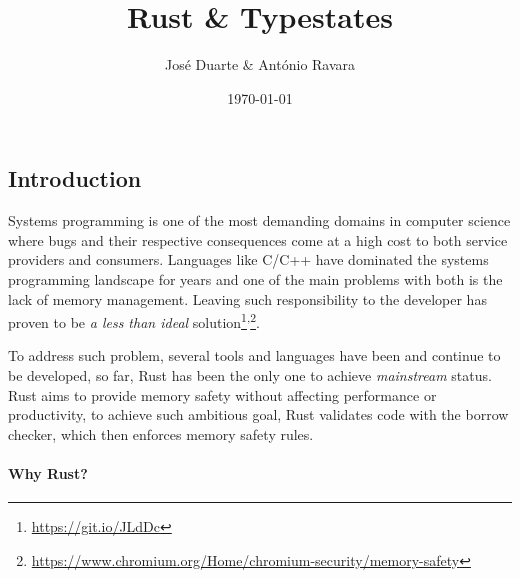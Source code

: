 \documentclass[a4paper, 10pt]{article}
\title{Rust \& Typestates}
\date{\today}
\author{José Duarte \& António Ravara}
\begin{document}
\maketitle

\subsection*{Introduction}

%

Systems programming is one of the most demanding domains in computer science where
bugs and their respective consequences come at a high cost to both service providers and consumers.
Languages like C/C++ have dominated the systems programming landscape for years and
one of the main problems with both is the lack of memory management.
Leaving such responsibility to the developer has proven to be \emph{a less than ideal}
solution\footnote{\url{https://git.io/JLdDc}}\textsuperscript{,}\footnote{\url{https://www.chromium.org/Home/chromium-security/memory-safety}}.

To address such problem, several tools and languages have been and continue to be developed,
so far, Rust has been the only one to achieve \emph{mainstream} status.
Rust aims to provide memory safety without affecting performance or productivity,
to achieve such ambitious goal, Rust validates code with the borrow checker, which then enforces memory safety rules.

\paragraph{Why Rust?}
\end{document}
